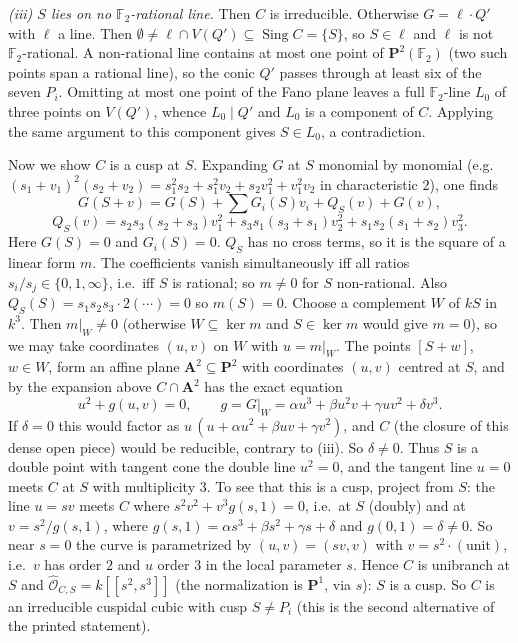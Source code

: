 \documentclass[11pt]{article}
\begin{document}
\emph{(iii) $S$ lies on no $\mathbb F_2$-rational line.} Then $C$ is irreducible. Otherwise $G=\ell\cdot Q'$ with $\ell$ a line. Then $\emptyset\ne\ell\cap V(Q')\subseteq\operatorname{Sing}C=\{S\}$, so $S\in\ell$ and $\ell$ is not $\mathbb F_2$-rational. A non-rational line contains at most one point of $\mathbf P^2(\mathbb F_2)$ (two such points span a rational line), so the conic $Q'$ passes through at least six of the seven $P_i$. Omitting at most one point of the Fano plane leaves a full $\mathbb F_2$-line $L_0$ of three points on $V(Q')$, whence $L_0\mid Q'$ and $L_0$ is a component of $C$. Applying the same argument to this component gives $S\in L_0$, a contradiction.

Now we show $C$ is a cusp at $S$. Expanding $G$ at $S$ monomial by monomial (e.g.\ $(s_1+v_1)^2(s_2+v_2)=s_1^2s_2+s_1^2v_2+s_2v_1^2+v_1^2v_2$ in characteristic $2$), one finds
\[
G(S+v)=G(S)+\sum G_i(S)v_i+Q_S(v)+G(v),
\]
\[
Q_S(v)=s_2s_3(s_2+s_3)v_1^2+s_3s_1(s_3+s_1)v_2^2+s_1s_2(s_1+s_2)v_3^2 .
\]
Here $G(S)=0$ and $G_i(S)=0$. $Q_S$ has no cross terms, so it is the square of a linear form $m$. The coefficients vanish simultaneously iff all ratios $s_i/s_j\in\{0,1,\infty\}$, i.e.\ iff $S$ is rational; so $m\ne0$ for $S$ non-rational. Also $Q_S(S)=s_1s_2s_3\cdot2(\cdots)=0$ so $m(S)=0$. Choose a complement $W$ of $kS$ in $k^3$. Then $m|_W\ne0$ (otherwise $W\subseteq\ker m$ and $S\in\ker m$ would give $m=0$), so we may take coordinates $(u,v)$ on $W$ with $u=m|_W$. The points $[S+w]$, $w\in W$, form an affine plane $\mathbf A^2\subseteq\mathbf P^2$ with coordinates $(u,v)$ centred at $S$, and by the expansion above $C\cap\mathbf A^2$ has the exact equation
\[
u^2+g(u,v)=0,\qquad g=G|_W=\alpha u^3+\beta u^2v+\gamma uv^2+\delta v^3 .
\]
If $\delta=0$ this would factor as $u\,(u+\alpha u^2+\beta uv+\gamma v^2)$, and $C$ (the closure of this dense open piece) would be reducible, contrary to (iii). So $\delta\ne0$. Thus $S$ is a double point with tangent cone the double line $u^2=0$, and the tangent line $u=0$ meets $C$ at $S$ with multiplicity $3$. To see that this is a cusp, project from $S$: the line $u=sv$ meets $C$ where $s^2v^2+v^3g(s,1)=0$, i.e.\ at $S$ (doubly) and at $v=s^2/g(s,1)$, where $g(s,1)=\alpha s^3+\beta s^2+\gamma s+\delta$ and $g(0,1)=\delta\ne0$. So near $s=0$ the curve is parametrized by $(u,v)=(sv,v)$ with $v=s^2\cdot(\text{unit})$, i.e.\ $v$ has order $2$ and $u$ order $3$ in the local parameter $s$. Hence $C$ is unibranch at $S$ and $\widehat{\mathcal O}_{C,S}=k[[s^2,s^3]]$ (the normalization is $\mathbf P^1$, via $s$): $S$ is a cusp. So $C$ is an irreducible cuspidal cubic with cusp $S\ne P_i$ (this is the second alternative of the printed statement).
\end{document}
